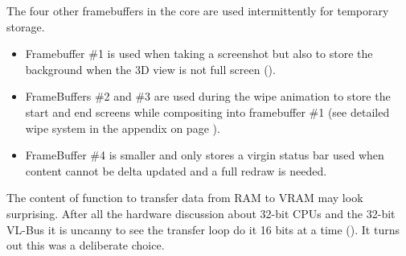 \par
The four other framebuffers in the core are used intermittently for temporary storage.
\begin{itemize} 
\item Framebuffer \#1 is used when taking a screenshot but also to store the background when the 3D view is not full screen ().

\item FrameBuffers \#2 and \#3 are used during the wipe animation to store the start and end screens while compositing into framebuffer \#1 (see detailed wipe system in the appendix on page \pageref{label_melt}). 
\item FrameBuffer \#4 is smaller and only stores a virgin status bar used when content cannot be delta updated and a full redraw is needed. 
\end{itemize}
\par



The content of function  to transfer data from RAM to VRAM may look surprising. After all the hardware discussion about 32-bit CPUs and the 32-bit VL-Bus it is uncanny to see the transfer loop do it 16 bits at a time (). It turns out this was a deliberate choice.\\
\par
{}\\
\par
{}
\par
